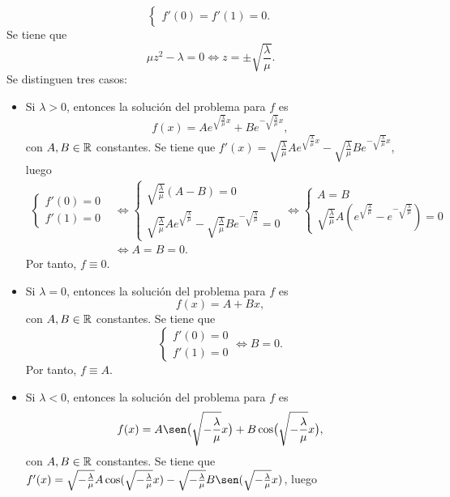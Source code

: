 \documentclass[11pt]{report}
\begin{document}
\begin{solution}
\begin{enumerate}
\[\begin{cases}
            f'(0) = f'(1) = 0.
        \end{cases}\]
        Se tiene que
        \[\mu z^2-\lambda = 0 \iff z = \pm \sqrt{\frac{\lambda}{\mu}}.\]
        Se distinguen tres casos:
        \begin{itemize}
            \item Si $\lambda > 0$, entonces la solución del problema para $f$ es
            \[f(x) = Ae^{\sqrt{\frac{\lambda}{\mu}}x}+Be^{-\sqrt{\frac{\lambda}{\mu}} x},\]
            con $A,B\in\mathbb R$ constantes. Se tiene que $f'(x) = \sqrt{\frac{\lambda}{\mu}}Ae^{\sqrt{\frac{\lambda}{\mu}}x}-\sqrt{\frac{\lambda}{\mu}}Be^{-\sqrt{\frac{\lambda}{\mu}}x}$, luego
            \begin{align*}
                \begin{cases}
                    f'(0)=0 \\
                    f'(1)=0
                \end{cases} &\iff \begin{cases}
                    \sqrt{\frac{\lambda}{\mu}}(A-B)=0 \\
                    \sqrt{\frac{\lambda}{\mu}}Ae^{\sqrt{\frac{\lambda}{\mu}}}-\sqrt{\frac{\lambda}{\mu}}Be^{-\sqrt{\frac{\lambda}{\mu}}} = 0
                \end{cases} \iff \begin{cases}
                    A=B \\
                    \sqrt{\frac{\lambda}{\mu}}A(e^{\sqrt{\frac{\lambda}{\mu}}}-e^{-\sqrt{\frac{\lambda}{\mu}}})=0
                \end{cases} \\ &\iff A = B = 0.
            \end{align*}
            Por tanto, $f \equiv 0$.
            \item Si $\lambda = 0$, entonces la solución del problema para $f$ es
            \[f(x) = A+Bx,\]
            con $A,B\in\mathbb R$ constantes. Se tiene que
            \[\begin{cases}
                f'(0)=0\\
                f'(1)=0
            \end{cases} \iff B = 0.\]
            Por tanto, $f \equiv A$.
            \item Si $\lambda < 0$, entonces la solución del problema para $f$ es
            \[f(x) = A\sen\bigl(\sqrt{-\frac{\lambda}{\mu}}x\bigr)+B\cos\bigl(\sqrt{-\frac{\lambda}{\mu}}x\bigr),\]
            con $A,B\in\mathbb R$ constantes. Se tiene que $f'(x) = \sqrt{-\frac{\lambda}{\mu}} A \cos(\sqrt{-\frac{\lambda}{\mu}}x)-\sqrt{-\frac{\lambda}{\mu}}B\sen(\sqrt{-\frac{\lambda}{\mu}}x)$, luego

\end{itemize}
\end{enumerate}
\end{solution}
\end{document}
